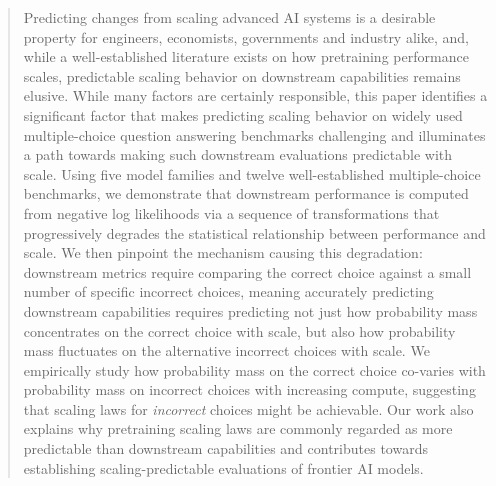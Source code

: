 \documentclass{article}
\begin{document}
\printAffiliationsAndNotice{}  %

\begin{abstract}
Predicting changes from scaling advanced AI systems is a desirable property for engineers, economists, governments and industry alike, and, while a well-established literature exists on how pretraining performance scales, predictable scaling behavior on downstream capabilities remains elusive. 
While many factors are certainly responsible, this paper identifies a significant factor that makes predicting scaling behavior on widely used multiple-choice question answering benchmarks challenging and illuminates a path towards making such downstream evaluations predictable with scale.
Using five model families and twelve well-established multiple-choice benchmarks, we demonstrate that downstream performance is computed from negative log likelihoods via a sequence of transformations that progressively degrades the statistical relationship between performance and scale.
We then pinpoint the mechanism causing this degradation: downstream metrics require comparing the correct choice against a small number of specific incorrect choices, meaning accurately predicting downstream capabilities requires predicting not just how probability mass concentrates on the correct choice with scale, but also how probability mass fluctuates on the alternative incorrect choices with scale.
We empirically study how probability mass on the correct choice co-varies with probability mass on incorrect choices with increasing compute, suggesting that scaling laws for \textit{incorrect} choices might be achievable.
Our work also explains why pretraining scaling laws are commonly regarded as more predictable than downstream capabilities and contributes towards establishing scaling-predictable evaluations of frontier AI models.
\end{abstract}








\end{document}
